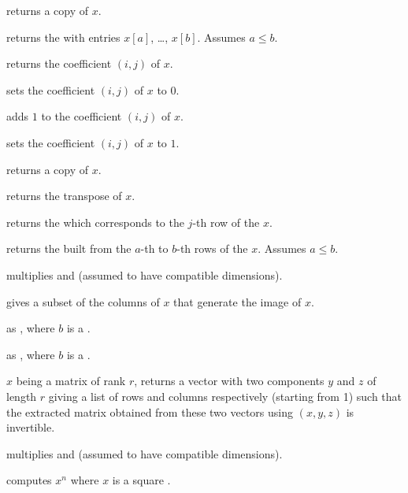  returns a copy of $x$.

 returns the  with
entries $x[a]$, \dots, $x[b]$. Assumes $a \leq b$.

 returns the coefficient $(i,j)$
of $x$.

 sets the coefficient $(i,j)$ of $x$
to $0$.

 adds $1$ to the coefficient $(i,j)$
of $x$.

 sets the coefficient $(i,j)$ of $x$
to $1$.

 returns a copy of $x$.

 returns the transpose of $x$.

 returns the  which corresponds
to the $j$-th row of the  $x$.

 returns the  built
from the $a$-th to $b$-th rows of the  $x$. Assumes $a \leq b$.

 multiplies   and  (assumed
to have compatible dimensions).

 gives a subset of the columns of $x$ that generate
the image of $x$.



as , where $b$ is a .

as , where $b$ is a .


 $x$ being a matrix of rank $r$, returns a
vector with two  components $y$ and $z$ of length $r$ giving a
list of rows and columns respectively (starting from 1) such that the extracted
matrix obtained from these two vectors using $(x,y,z)$ is
invertible.

 multiplies   and  (assumed to
have compatible dimensions).

 computes $x^n$ where $x$ is a square
.

